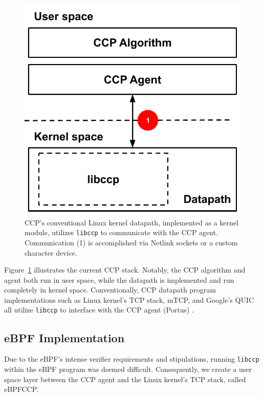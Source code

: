\documentclass[../main.tex]{subfiles}
\begin{document}
\begin{figure}[t]
\centering
    \includegraphics[width=\columnwidth]{img/ccp-traditional}
    \caption{CCP's conventional Linux kernel datapath, implemented as a kernel module, utilizes \texttt{libccp} to communicate with the CCP agent.
        Communication (1) is accomplished via Netlink sockets or a custom character device.
    }\label{fig:ccptraditional}
\end{figure}

Figure~\ref{fig:ccptraditional} illustrates the current CCP stack.
Notably, the CCP algorithm and agent both run in user space, while the datapath is implemented and run completely in kernel space.
Conventionally, CCP datapath program implementations such as Linux kernel's TCP stack, mTCP, and Google's QUIC all utilize \texttt{libccp} to interface with the CCP agent (Portus) \cite{ccp}.

\subsection{eBPF Implementation}

Due to the eBPF's intense verifier requirements and stipulations, running \texttt{libccp} within the eBPF program was deemed difficult.
Consequently, we create a user space layer between the CCP agent and the Linux kernel's TCP stack, called eBPFCCP.
\end{document}
